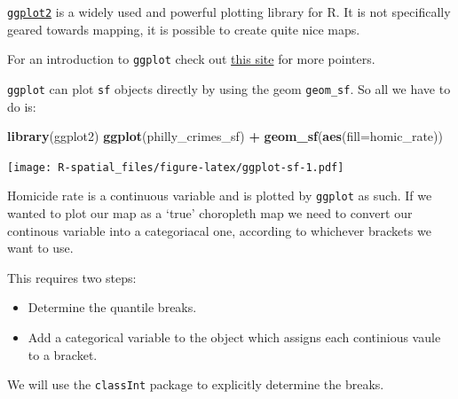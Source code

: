 \documentclass[
]{book}
\newenvironment{Shaded}{\begin{snugshade}}{\end{snugshade}}
\newcommand{\AttributeTok}[1]{\textcolor[rgb]{0.13,0.29,0.53}{#1}}
\newcommand{\CommentTok}[1]{\textcolor[rgb]{0.56,0.35,0.01}{\textit{#1}}}
\newcommand{\DecValTok}[1]{\textcolor[rgb]{0.00,0.00,0.81}{#1}}
\newcommand{\FunctionTok}[1]{\textcolor[rgb]{0.13,0.29,0.53}{\textbf{#1}}}
\newcommand{\NormalTok}[1]{#1}
\newcommand{\OtherTok}[1]{\textcolor[rgb]{0.56,0.35,0.01}{#1}}
\newcommand{\SpecialCharTok}[1]{\textcolor[rgb]{0.81,0.36,0.00}{\textbf{#1}}}
\newcommand{\StringTok}[1]{\textcolor[rgb]{0.31,0.60,0.02}{#1}}
\providecommand{\tightlist}{%
  \setlength{\itemsep}{0pt}\setlength{\parskip}{0pt}}
\begin{document}
\href{http://ggplot2.org/}{\texttt{ggplot2}} is a widely used and powerful plotting library for R. It is not specifically geared towards mapping, it is possible to create quite nice maps.

For an introduction to \texttt{ggplot} check out \href{http://ggplot2.tidyverse.org/}{this site} for more pointers.

\texttt{ggplot} can plot \texttt{sf} objects directly by using the geom \texttt{geom\_sf}. So all we have to do is:

\begin{Shaded}
\begin{Highlighting}[]
\FunctionTok{library}\NormalTok{(ggplot2)}
\FunctionTok{ggplot}\NormalTok{(philly\_crimes\_sf) }\SpecialCharTok{+} 
  \FunctionTok{geom\_sf}\NormalTok{(}\FunctionTok{aes}\NormalTok{(}\AttributeTok{fill=}\NormalTok{homic\_rate))}
\end{Highlighting}
\end{Shaded}

\texttt{[image: R-spatial\_files/figure-latex/ggplot-sf-1.pdf]}

Homicide rate is a continuous variable and is plotted by \texttt{ggplot} as such. If we wanted to plot our map as a `true' choropleth map we need to convert our continous variable into a categoriacal one, according to whichever brackets we want to use.

This requires two steps:

\begin{itemize}
\tightlist
\item
  Determine the quantile breaks.
\item
  Add a categorical variable to the object which assigns each continious vaule to a bracket.
\end{itemize}

We will use the \texttt{classInt} package to explicitly determine the breaks.

\begin{Shaded}
\end{Shaded}
\end{document}
